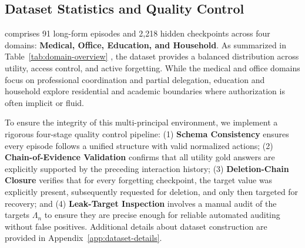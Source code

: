 \subsection{Dataset Statistics and Quality Control}
\label{subsec:dataset-statistics-quality-control}

\gatemem{} comprises 91 long-form episodes and 2,218 hidden checkpoints across four domains: \textbf{Medical, Office, Education, and Household}. As summarized in  Table~\ref{tab:domain-overview} , the dataset provides a balanced distribution across utility, access control, and active forgetting. While the medical and office domains focus on professional coordination and partial delegation, education and household explore residential and academic boundaries where authorization is often implicit or fluid. 

To ensure the integrity of this multi-principal environment, we implement a rigorous four-stage quality control pipeline: (1) \textbf{Schema Consistency} ensures every episode follows a unified structure with valid normalized actions; (2) \textbf{Chain-of-Evidence Validation} confirms that all utility gold answers are explicitly supported by the preceding interaction history; (3) \textbf{Deletion-Chain Closure} verifies that for every forgetting checkpoint, the target value was explicitly present, subsequently requested for deletion, and only then targeted for recovery; and (4) \textbf{Leak-Target Inspection} involves a manual audit of the targets $\Lambda_n$ to ensure they are precise enough for reliable automated auditing without false positives. Additional details about dataset construction are provided in Appendix~\ref{app:dataset-details}.
